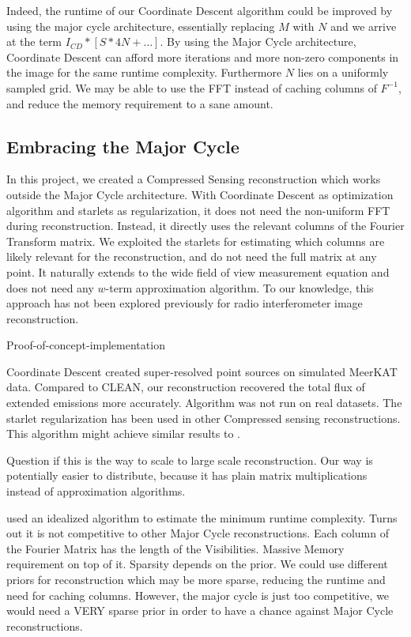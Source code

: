 Indeed, the runtime of our Coordinate Descent algorithm could be improved by using the major cycle architecture, essentially replacing $M$ with $N$ and we arrive at the term $I_{CD} * [S * 4N +\ldots]$. By using the Major Cycle architecture, Coordinate Descent can afford more iterations and more non-zero components in the image for the same runtime complexity. Furthermore $N$ lies on a uniformly sampled grid. We may be able to use the FFT instead of caching columns of $F^{-1}$, and reduce the memory requirement to a sane amount.

\subsection{Embracing the Major Cycle}
In this project, we created a Compressed Sensing reconstruction which works outside the Major Cycle architecture. With Coordinate Descent as optimization algorithm and starlets as regularization,  it does not need the non-uniform FFT during reconstruction. Instead, it directly uses the relevant columns of the Fourier Transform matrix.  We exploited the starlets for estimating which columns are likely relevant for the reconstruction, and do not need the full matrix at any point. It naturally extends to the wide field of view measurement equation and does not need any $w$-term approximation algorithm. To our knowledge, this approach has not been explored previously for radio interferometer image reconstruction. 

Proof-of-concept-implementation

Coordinate Descent created super-resolved point sources on simulated MeerKAT data. Compared to CLEAN, our reconstruction recovered the total flux of extended emissions more accurately. Algorithm was not run on real datasets. The starlet regularization has been used in other Compressed sensing reconstructions. This algorithm might achieve similar results to \cite{girard2015sparse}.

Question if this is the way to scale to large scale reconstruction. Our way is potentially easier to distribute, because it has plain matrix multiplications instead of approximation algorithms.

used an idealized algorithm to estimate the minimum runtime complexity. Turns out it is not competitive to other Major Cycle reconstructions. Each column of the Fourier Matrix has the length of the Visibilities. Massive Memory requirement on top of it.  Sparsity depends on the prior. We could use different priors for reconstruction which may be more sparse, reducing the runtime and need for caching columns. However, the major cycle is just too competitive, we would need a VERY sparse prior in order to have a chance against Major Cycle reconstructions.

